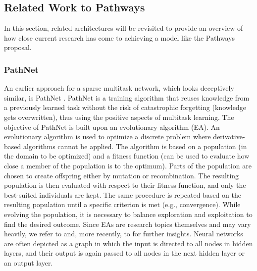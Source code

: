 \documentclass[
]{krantz}
\begin{document}
\hypertarget{related-work-to-pathways}{%
\subsection{Related Work to Pathways}\label{related-work-to-pathways}}

In this section, related architectures will be revisited to provide an overview of how close current research has come to achieving a model like the Pathways proposal.

\hypertarget{pathnet}{%
\subsubsection{PathNet}\label{pathnet}}

An earlier approach for a sparse multitask network, which looks deceptively similar, is PathNet \citep{Fernando2017}. PathNet is a training algorithm that reuses knowledge from a previously learned task without the risk of catastrophic forgetting (knowledge gets overwritten), thus using the positive aspects of multitask learning. The objective of PathNet is built upon an evolutionary algorithm (EA). An evolutionary algorithm is used to optimize a discrete problem where derivative-based algorithms cannot be applied. The algorithm is based on a population (in the domain to be optimized) and a fitness function (can be used to evaluate how close a member of the population is to the optimum). Parts of the population are chosen to create offspring either by mutation or recombination. The resulting population is then evaluated with respect to their fitness function, and only the best-suited individuals are kept. The same procedure is repeated based on the resulting population until a specific criterion is met (e.g., convergence). While evolving the population, it is necessary to balance exploration and exploitation to find the desired outcome. Since EAs are research topics themselves and may vary heavily, we refer to \citep{Baeck1993} and, more recently, to \citep{Doerr2021} for further insights. Neural networks are often depicted as a graph in which the input is directed to all nodes in hidden layers, and their output is again passed to all nodes in the next hidden layer or an output layer.
\end{document}
